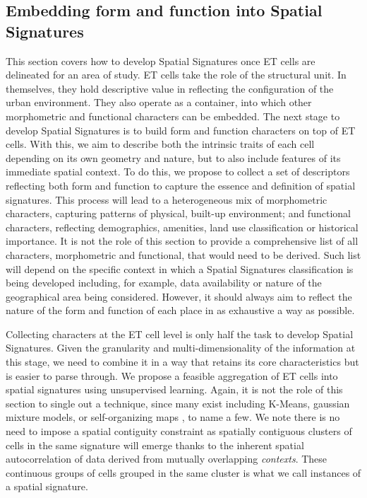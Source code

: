 \subsection{Embedding form and function into Spatial Signatures}
\label{ssec:ss_ff}

%
This section covers how to develop Spatial Signatures once ET cells are
delineated for an area of study.
ET cells take the role of the structural unit.
In themselves, they hold descriptive value in reflecting the configuration of
the urban environment. They also operate as a container, into which other
morphometric and functional characters can be embedded.
The next stage to develop Spatial Signatures is to build form and function
characters on top of ET cells. With this, we aim to describe both the
intrinsic traits of each cell depending on its own
geometry and nature, but to also include features of its immediate spatial
context.
To do this, we propose to collect a set of descriptors reflecting both form
and function to capture the essence and definition of spatial signatures.
%
This process will lead to a heterogeneous
mix of morphometric characters, capturing patterns of physical, built-up
environment; and functional characters, reflecting demographics, amenities,
land use classification or historical importance.
It is not the role of this
section to provide a comprehensive list of all characters, morphometric and
functional, that would need to be derived. Such list will depend on the
specific context in which a Spatial Signatures classification is being
developed including, for example, data availability or nature of the
geographical area being considered.
%
However, it should always aim to reflect the nature of the form and function
of each place in as exhaustive a way as possible.

Collecting characters at the ET cell level is only half the task to develop
Spatial Signatures. Given the granularity and multi-dimensionality of the
information at this stage, we need to combine it in a way that retains its
core characteristics but is easier to parse through.
%
We propose a feasible aggregation of ET cells into
spatial signatures using unsupervised learning. Again, it is not the role of
this section to single out a technique, since many exist including K-Means,
gaussian mixture models, or self-organizing maps \citep{kohonen1990self}, to
name a few. We note there is no need to impose a spatial contiguity constraint
as spatially contiguous clusters of cells in the same signature will emerge
thanks to the inherent spatial autocorrelation of data derived from mutually
overlapping \textit{contexts}.
%
These continuous groups of cells grouped in the same cluster is what we call
instances of a spatial signature.
